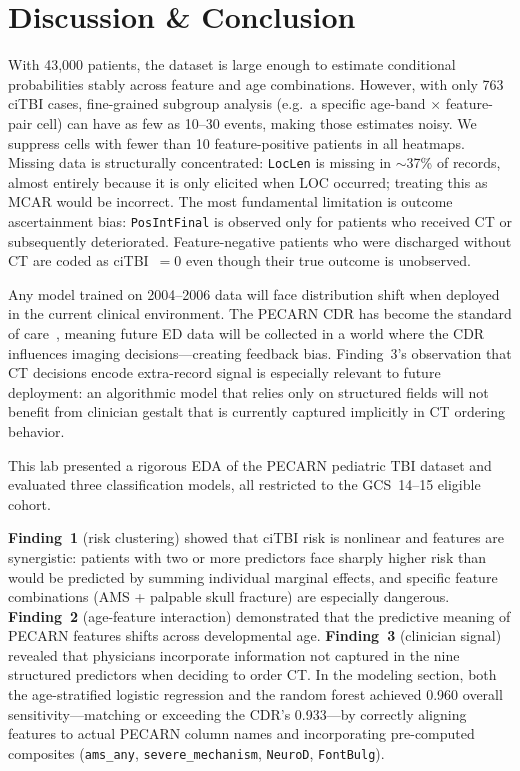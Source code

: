 \documentclass[10pt,letterpaper]{article}
\begin{document}
\section{Discussion \& Conclusion}
\label{discussion}

With 43,000 patients, the dataset is large enough to estimate conditional probabilities stably
across feature and age combinations.
However, with only 763 ciTBI cases, fine-grained subgroup analysis (e.g.\ a specific age-band
$\times$ feature-pair cell) can have as few as 10--30 events, making those estimates noisy.
We suppress cells with fewer than 10 feature-positive patients in all heatmaps.
Missing data is structurally concentrated: \texttt{LocLen} is missing in $\sim$37\% of records,
almost entirely because it is only elicited when LOC occurred; treating this as MCAR would be
incorrect.
The most fundamental limitation is outcome ascertainment bias: \texttt{PosIntFinal} is observed
only for patients who received CT or subsequently deteriorated.
Feature-negative patients who were discharged without CT are coded as ciTBI~$= 0$ even though
their true outcome is unobserved.

Any model trained on 2004--2006 data will face distribution
shift when deployed in the current clinical environment.
The PECARN CDR has become the standard of care~\cite{kuppermann2009}, meaning future ED data
will be collected in a world where the CDR influences imaging decisions---creating feedback bias.
Finding~3's observation that CT decisions encode extra-record signal is especially relevant to
future deployment: an algorithmic model that relies only on structured fields will not benefit
from clinician gestalt that is currently captured implicitly in CT ordering behavior.

This lab presented a rigorous EDA of the PECARN pediatric TBI dataset and evaluated three
classification models, all restricted to the GCS~14--15 eligible cohort.

\textbf{Finding~1} (risk clustering) showed that ciTBI risk is nonlinear and features are
synergistic: patients with two or more predictors face sharply higher risk than would be
predicted by summing individual marginal effects, and specific feature combinations (AMS +
palpable skull fracture) are especially dangerous.
\textbf{Finding~2} (age-feature interaction) demonstrated that the predictive meaning of PECARN
features shifts across developmental age.
\textbf{Finding~3} (clinician signal) revealed that physicians incorporate information not
captured in the nine structured predictors when deciding to order CT.
In the modeling section, both the age-stratified logistic regression and the random forest
achieved 0.960 overall sensitivity---matching or exceeding the CDR's 0.933---by correctly
aligning features to actual PECARN column names and incorporating pre-computed composites
(\texttt{ams\_any}, \texttt{severe\_mechanism}, \texttt{NeuroD}, \texttt{FontBulg}).
\end{document}
